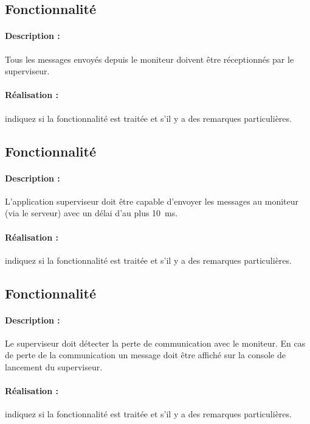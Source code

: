 \documentclass[11pt, a4paper]{paper}
\newcounter{cptreq}
\begin{document}
{\color{gray}
\subsection{Fonctionnalité \thecptreq *}

\paragraph{Description :} Tous les messages envoyés depuis le moniteur doivent être réceptionnés par le superviseur.

\paragraph{\color{black}Réalisation :}  {\color{red} indiquez si la fonctionnalité est traitée et s'il y a des remarques particulières.}
\subsection{Fonctionnalité \thecptreq *}

\paragraph{Description :} L'application superviseur doit être capable d'envoyer les messages au moniteur (via le serveur) avec un délai d'au plus 10~ms.

\paragraph{\color{black}Réalisation :}  {\color{red} indiquez si la fonctionnalité est traitée et s'il y a des remarques particulières.}
}
\subsection{Fonctionnalité \thecptreq}

\paragraph{Description :} Le superviseur doit détecter la perte de communication avec le moniteur. En cas de perte de la communication un message doit être affiché sur la console de lancement du superviseur.

\paragraph{\color{black}Réalisation :}  {\color{red} indiquez si la fonctionnalité est traitée et s'il y a des remarques particulières.}
\end{document}
